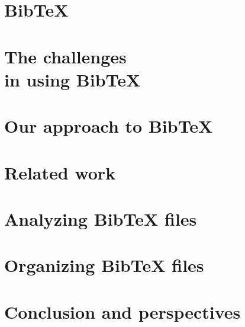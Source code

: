 \documentclass[twoside,11pt,openright,a4paper]{report}
\newcommand{\bibtex}{Bib{\TeX}}
\begin{document}
\chapter{{\bibtex}}
\label{ch:about}


\chapter{The challenges\\in using {\bibtex}}
\label{ch:problem-description}


\chapter{Our approach to {\bibtex}}
\label{ch:approach}


\chapter{Related work}
\label{ch:related}


\chapter{Analyzing {\bibtex} files}
\label{ch:analyzing}


\chapter{Organizing {\bibtex} files}
\label{ch:organizing}


\chapter{Conclusion and perspectives}
\label{ch:conclusion}


\printbibliography{}
\end{document}
